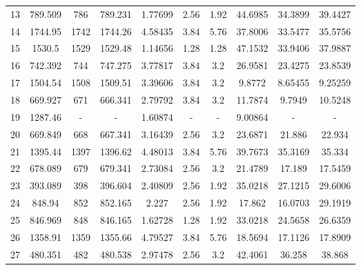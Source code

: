 \begin{table}
\begin{tabular}{cccccccccc}
      13   &  789.509  &       786       &  789.231  & 1.77699  &      2.56      &   1.92   &  44.6985   &     34.3899      &  39.4427   \\
      14   &  1744.95  &      1742       &  1744.26  & 4.58435  &      3.84      &   5.76   &  37.8006   &     33.5477      &  35.5756   \\
      15   &  1530.5   &      1529       &  1529.48  & 1.14656  &      1.28      &   1.28   &  47.1532   &     33.9406      &  37.9887   \\
      16   &  742.392  &       744       &  747.275  & 3.77817  &      3.84      &   3.2    &  26.9581   &     23.4275      &  23.8539   \\
      17   &  1504.54  &      1508       &  1509.51  & 3.39606  &      3.84      &   3.2    &   9.8772   &     8.65455      &  9.25259   \\
      18   &  669.927  &       671       &  666.341  & 2.79792  &      3.84      &   3.2    &  11.7874   &      9.7949      &  10.5248   \\
      19   &  1287.46  &        -        &     -     & 1.60874  &       -        &    -     &  9.00864   &        -         &     -      \\
      20   &  669.849  &       668       &  667.341  & 3.16439  &      2.56      &   3.2    &  23.6871   &      21.886      &   22.934   \\
      21   &  1395.44  &      1397       &  1396.62  & 4.48013  &      3.84      &   5.76   &  39.7673   &     35.3169      &   35.334   \\
      22   &  678.089  &       679       &  679.341  & 2.73084  &      2.56      &   3.2    &  21.4789   &      17.189      &  17.5459   \\
      23   &  393.089  &       398       &  396.604  & 2.40809  &      2.56      &   1.92   &  35.0218   &     27.1215      &  29.6006   \\
      24   &  848.94   &       852       &  852.165  &  2.227   &      2.56      &   1.92   &   17.862   &     16.0703      &  29.1919   \\
      25   &  846.969  &       848       &  846.165  & 1.62728  &      1.28      &   1.92   &  33.0218   &     24.5658      &  26.6359   \\
      26   &  1358.91  &      1359       &  1355.66  & 4.79527  &      3.84      &   5.76   &  18.5694   &     17.1126      &  17.8909   \\
      27   &  480.351  &       482       &  480.538  & 2.97478  &      2.56      &   3.2    &  42.4061   &      36.258      &   38.868   \\

\end{tabular}
\end{table}
